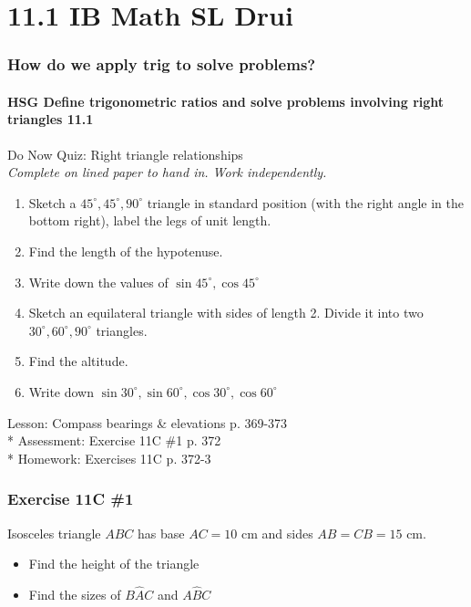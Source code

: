 \documentclass{beamer}
\begin{document}
\section{11.1 IB Math SL Drui}
\frame
{
  \frametitle{How do we apply trig to solve problems?}
  \framesubtitle{HSG Define trigonometric ratios and solve problems involving right triangles \qquad \alert{11.1}}

\begin{block}{Do Now Quiz: Right triangle relationships\\
    \emph{Complete on lined paper to hand in. Work independently.}}
  \begin{enumerate}
    \item Sketch a $45^\circ, 45^\circ, 90^\circ$ triangle in standard position (with the right angle in the bottom right), label the legs of unit length.
    \item Find the length of the hypotenuse.
    \item Write down the values of $\sin{45^\circ}, \cos{45^\circ}$ 
    \item Sketch an equilateral triangle with sides of length 2. Divide it into two $30^\circ, 60^\circ, 90^\circ$ triangles.
    \item Find the altitude.
    \item Write down $\sin{30^\circ}, \sin{60^\circ}, \cos{30^\circ}, \cos{60^\circ}$
    \end{enumerate}
  \end{block}
  Lesson: Compass bearings \& elevations p. 369-373\\*
  Assessment: Exercise 11C \#1 p. 372\\*
  Homework: Exercises 11C p. 372-3\\
}

\frame
{
  \frametitle{Exercise 11C \#1}
  Isosceles triangle $ABC$ has base $AC = 10 \text{ cm}$ and sides $AB=CB=15 \text{ cm}$.
\begin{itemize}
      \item Find the height of the triangle
      \item Find the sizes of $B\hat{A}C$ and $A\hat{B}C$
\end{itemize}
\begin{center}
\end{center}
 }
\end{document}
